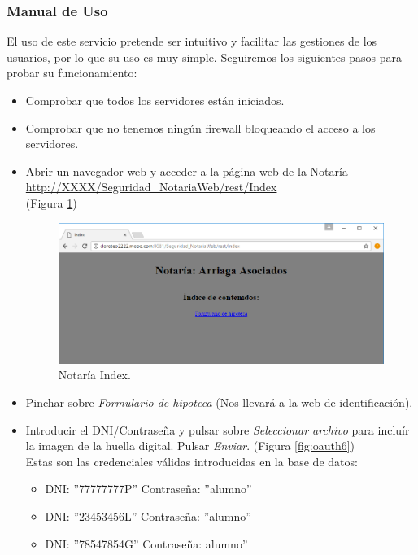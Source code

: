 \documentclass[a4,12pt,onecolum]{article}
\begin{document}

\subsubsection{Manual de Uso}

El uso de este servicio pretende ser intuitivo y facilitar las gestiones de los usuarios, por lo que su uso es muy simple. Seguiremos los siguientes pasos para probar su funcionamiento:

\begin{itemize}
	\item Comprobar que todos los servidores están iniciados.
	
	\item Comprobar que no tenemos ningún firewall bloqueando el acceso a los servidores.
	
	\item Abrir un navegador web y acceder a la página web de la Notaría \\
		\url{http://XXXX/Seguridad\_NotariaWeb/rest/Index}	\\
		(Figura \ref{fig:oauth5})
		
\begin{figure}[htbp]
\centering
\includegraphics[width=1.1\textwidth]{./images/oauth/notaria_index.png}
\caption{Notaría Index.}
\label{fig:oauth5}
\end{figure}
	
	\item Pinchar sobre \emph{Formulario de hipoteca} (Nos llevará a la web de identificación).
	
	\item Introducir el DNI/Contraseña y pulsar sobre \emph{Seleccionar archivo} para incluír la imagen de la 		huella digital. Pulsar \emph{Enviar}. (Figura \ref{fig:oauth6}) \\
	Estas son las credenciales válidas introducidas en la base de datos:
	\begin{itemize}
		\item DNI: ''77777777P'' Contraseña: ''alumno''
		\item DNI: ''23453456L'' Contraseña: ''alumno''
		\item DNI: ''78547854G'' Contraseña: alumno''
	\end{itemize}
	

\end{itemize}
\end{document}
